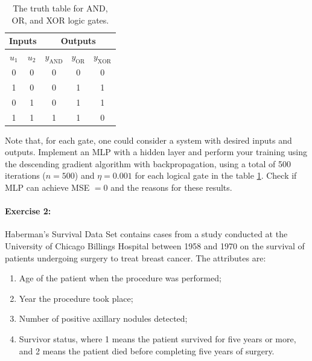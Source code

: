 \begin{table}[h!]
\caption{The truth table for AND, OR, and XOR logic gates.}
\label{tab:verdade}
\begin{center}
\begin{tabular}{cc|ccc}
\hline
\multicolumn{2}{c|}{Inputs} & \multicolumn{3}{c}{Outputs}                                  \\ \hline
$u_1$         & $u_2$        & $y_{\textrm{AND}}$ & $y_{\textrm{OR}}$ & $y_{\textrm{XOR}}$ \\ \hline
0             & 0            & 0                  & 0                 & 0                  \\
1             & 0            & 0                  & 1                 & 1                  \\
0             & 1            & 0                  & 1                 & 1                  \\
1             & 1            & 1                  & 1                 & 0                 \\ \hline
\end{tabular}
\end{center}
\end{table}

Note that, for each gate, one could consider a system with desired inputs and outputs. Implement an MLP with a hidden layer and perform your training using the descending gradient algorithm with backpropagation, using a total of 500 iterations ($n = 500$) and $\eta = 0.001$ for each logical gate in the table \ref{tab:verdade}. Check if MLP can achieve MSE $ = 0$ and the reasons for these results.

\paragraph{\textbf{Exercise 2:}} Haberman's Survival Data Set contains cases from a study conducted at the University of Chicago Billings Hospital between 1958 and 1970 on the survival of patients undergoing surgery to treat breast cancer. The attributes are:
\begin{enumerate}
    \item Age of the patient when the procedure was performed;
	\item Year the procedure took place;
	\item Number of positive axillary nodules detected;
	\item Survivor status, where 1 means the patient survived for five years or more, and 2 means the patient died before completing five years of surgery.
\end{enumerate}


